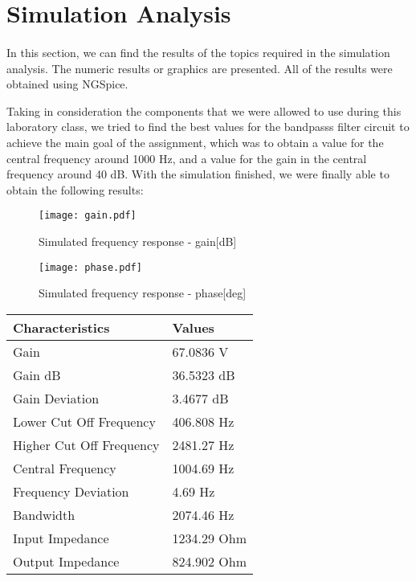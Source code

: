 \section{Simulation Analysis}
\label{sec:simulation}

\paragraph{}
In this section, we can find the results of the topics required in the simulation analysis. The numeric results or graphics are presented. All of the results were obtained using NGSpice. 

Taking in consideration the components that we were allowed to use during this laboratory class, we tried to find the best values for the bandpasss filter circuit to achieve the main goal of the assignment, which was to obtain a value for the central frequency around 1000 Hz, and a value for the gain in the central frequency around 40 dB. With the simulation finished, we were finally able to obtain the following results:

\begin{figure}[H]\centering
\texttt{[image: gain.pdf]}
\caption{Simulated frequency response - gain[dB]}
\label{fig:sim_output}
\end{figure}

\begin{figure}[H]\centering
\texttt{[image: phase.pdf]}
\caption{Simulated frequency response - phase[deg]}
\label{fig:sim_output2}
\end{figure}

\begin{table}[H]
\centering
\begin{tabular}{|l|l|} 
\hline
\textbf{Characteristics} & \textbf{Values}  \\ \hline
Gain & 67.0836 V\\ \hline
Gain dB & 36.5323 dB\\ \hline
Gain Deviation & 3.4677 dB\\ \hline
Lower Cut Off Frequency & 406.808 Hz\\ \hline
Higher Cut Off Frequency & 2481.27 Hz\\ \hline
Central Frequency & 1004.69 Hz\\ \hline
Frequency Deviation & 4.69 Hz\\ \hline
Bandwidth & 2074.46 Hz\\ \hline
Input Impedance & 1234.29 Ohm\\ \hline
Output Impedance & 824.902 Ohm\\ \hline
\end{tabular}
\end{table}

